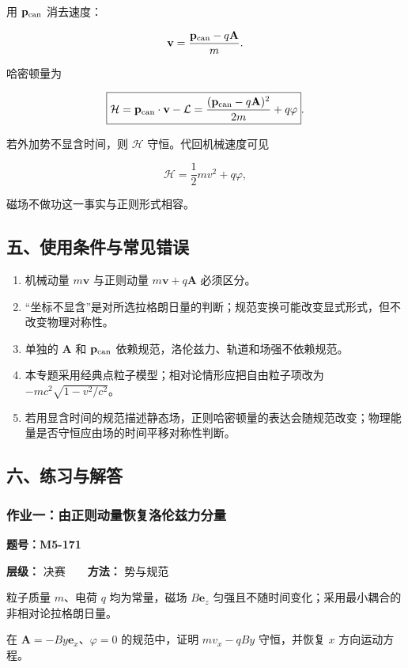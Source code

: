 用 \(\mathbf p_{\rm can}\) 消去速度：

\[
\mathbf v=\frac{\mathbf p_{\rm can}-q\mathbf A}{m}.
\]

哈密顿量为

\[
\boxed{
\mathcal H
=\mathbf p_{\rm can}\cdot\mathbf v-\mathcal L
=\frac{(\mathbf p_{\rm can}-q\mathbf A)^2}{2m}+q\varphi}.
\]

若外加势不显含时间，则 \(\mathcal H\) 守恒。代回机械速度可见

\[
\mathcal H=\frac12m v^2+q\varphi,
\]

磁场不做功这一事实与正则形式相容。

\subsection{五、使用条件与常见错误}\label{m5:ux4e94ux4f7fux7528ux6761ux4ef6ux4e0eux5e38ux89c1ux9519ux8bef}

\begin{enumerate}
\def\labelenumi{\arabic{enumi}.}
\tightlist
\item
  机械动量 \(m\mathbf v\) 与正则动量 \(m\mathbf v+q\mathbf A\)
  必须区分。
\item
  ``坐标不显含''是对所选拉格朗日量的判断；规范变换可能改变显式形式，但不改变物理对称性。
\item
  单独的 \(\mathbf A\) 和 \(\mathbf p_{\rm can}\)
  依赖规范，洛伦兹力、轨道和场强不依赖规范。
\item
  本专题采用经典点粒子模型；相对论情形应把自由粒子项改为
  \(-mc^2\sqrt{1-v^2/c^2}\)。
\item
  若用显含时间的规范描述静态场，正则哈密顿量的表达会随规范改变；物理能量是否守恒应由场的时间平移对称性判断。
\end{enumerate}

\subsection{六、练习与解答}\label{m5:ux516dux7ec3ux4e60ux4e0eux89e3ux7b54}

\par{}
\noindent\begin{minipage}{\linewidth}

\subsubsection{作业一：由正则动量恢复洛伦兹力分量}\label{m5:ux4f5cux4e1aux4e00ux7531ux6b63ux5219ux52a8ux91cfux6062ux590dux6d1bux4f26ux5179ux529bux5206ux91cf}

\textbf{题号：M5-171}

\textbf{层级：} 决赛　　\textbf{方法：} 势与规范

粒子质量 \(m\)、电荷 \(q\) 均为常量，磁场 \(B\mathbf e_z\)
匀强且不随时间变化；采用最小耦合的非相对论拉格朗日量。

在 \(\mathbf A=-By\mathbf e_x\)、\(\varphi=0\) 的规范中，证明
\(mv_x-qBy\) 守恒，并恢复 \(x\) 方向运动方程。

\end{minipage}\par

